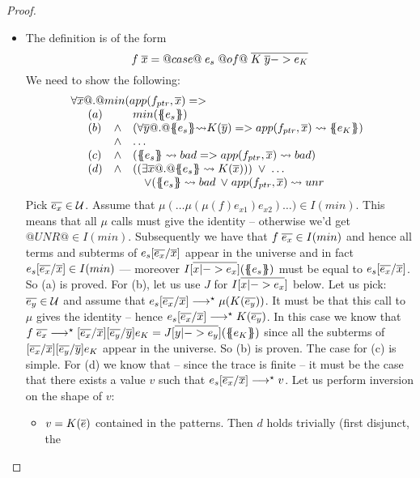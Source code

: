 \documentclass[preprint]{sigplanconf}
\begin{document}
\begin{proof}
\begin{itemize}
  \item The definition is of the form 
                 \[ f\;\overline{x} = @case@\;e_s\;@of@\;\overline{K\;\overline{y} -> e_K} \]
        We need to show the following:
        \[\begin{array}{l}
            \forall \xs @.@ min(app(f_{ptr},\xs) => \\
            \quad \begin{array}{lll}
             (a) &        & min(\etrans{}{}{e_s}) \\
             (b) & \land & (\forall\ys @.@ \etrans{}{}{e_s}{\red}K(\ys) => app(f_{ptr},\xs) \red \etrans{}{}{e_K}) \\
                 & \land & \ldots \\
             (c) & \land & (\etrans{}{}{e_s}\red\bad => app(f_{ptr},\xs) \red \bad) \\
             (d) & \land & ( (\exists \xs @.@ \etrans{}{}{e_s} \red K(\xs)))\;\lor\;\ldots \\
                 &       & \quad \lor (\etrans{}{}{e_s} \red \bad\;\lor\;app(f_{ptr},\xs) \red \unr 
                  \end{array}
        \end{array}\]
        Pick $\overline{e_x} \in {\cal U}$. Assume that $\mu(\ldots\mu(\mu(f) e_{x1}) e_{x2})\ldots) \in I(min)$. 
        This means that all $\mu$ calls must give the identity -- otherwise we'd get $@UNR@ \in I(min)$. 
        Subsequently we have that $f\;\overline{e_x} \in I(min)$ and hence all terms and subterms 
        of $e_s[\overline{e_x}/\overline{x}]$ appear in the universe and in fact $e_s[\overline{e_x}/\overline{x}] \in I(min)$ --- moreover
        $I[\overline{x |-> e_x}](\{\!\!\{{e_s}\}\!\!\})$ must be equal to $e_s[\overline{e_x}/\overline{x}]$. So (a) is proved. 
        For (b), let us use $J$ for $I[\overline{x |-> e_x}]$ below. Let us pick:
        $\overline{e_y} \in {\cal U}$ and assume that $e_s[\overline{e_x}/\overline{x}] \longrightarrow^{\star} \mu(K(\overline{e_y}))$. It must be that
        this call to $\mu$ gives the identity -- hence $e_s[\overline{e_x}/\overline{x}] \longrightarrow^{\star} K(\overline{e_y})$. In this case
        we know that $f\;\overline{e_x} \longrightarrow^{\star} [\overline{e_x}/\overline{x}][\overline{e_y}/\overline{y}]e_{K} = J[\overline{y |-> e_y}](\{\!\!\{{e_{K}}\}\!\!\})$ 
        since
        all the subterms of $[\overline{e_x}/\overline{x}][\overline{e_y}/\overline{y}]e_{K}$ appear in the universe. So (b) is proven.
        The case for (c) is simple.
        For (d) we know that -- since the trace is finite -- it must be the case that there exists a value $v$
        such that $e_s[\overline{e_x}/\overline{x}] \longrightarrow^{\star} v$. Let us perform inversion on the shape of $v$:
        \begin{itemize}
          \item $v = K(\overline{e})$ contained in the patterns. Then $d$ holds trivially (first disjunct, the 

\end{itemize}
\end{itemize}
\end{proof}
\end{document}
